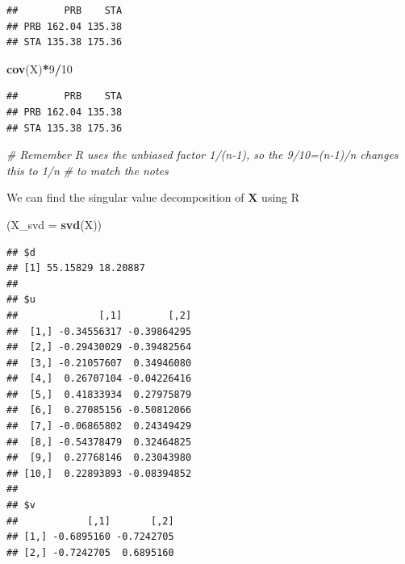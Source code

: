 \documentclass[]{book}
\newenvironment{Shaded}{\begin{snugshade}}{\end{snugshade}}
\newcommand{\CommentTok}[1]{\textcolor[rgb]{0.56,0.35,0.01}{\textit{#1}}}
\newcommand{\DataTypeTok}[1]{\textcolor[rgb]{0.13,0.29,0.53}{#1}}
\newcommand{\DecValTok}[1]{\textcolor[rgb]{0.00,0.00,0.81}{#1}}
\newcommand{\KeywordTok}[1]{\textcolor[rgb]{0.13,0.29,0.53}{\textbf{#1}}}
\newcommand{\NormalTok}[1]{#1}
\newcommand{\OperatorTok}[1]{\textcolor[rgb]{0.81,0.36,0.00}{\textbf{#1}}}
\newcommand{\StringTok}[1]{\textcolor[rgb]{0.31,0.60,0.02}{#1}}
\theoremstyle{definition}
\theoremstyle{definition}
\theoremstyle{definition}
\theoremstyle{remark}
\begin{document}
\begin{Shaded}
\end{Shaded}

\begin{verbatim}
##        PRB    STA
## PRB 162.04 135.38
## STA 135.38 175.36
\end{verbatim}

\begin{Shaded}
\begin{Highlighting}[]
\KeywordTok{cov}\NormalTok{(X)}\OperatorTok{*}\DecValTok{9}\OperatorTok{/}\DecValTok{10} 
\end{Highlighting}
\end{Shaded}

\begin{verbatim}
##        PRB    STA
## PRB 162.04 135.38
## STA 135.38 175.36
\end{verbatim}

\begin{Shaded}
\begin{Highlighting}[]
\CommentTok{# Remember R uses the unbiased factor 1/(n-1), so the 9/10=(n-1)/n changes this to 1/n }
\CommentTok{# to match the notes}
\end{Highlighting}
\end{Shaded}

We can find the singular value decomposition of \(\boldsymbol X\) using R

\begin{Shaded}
\begin{Highlighting}[]
\NormalTok{(}\DataTypeTok{X_svd =} \KeywordTok{svd}\NormalTok{(X))}
\end{Highlighting}
\end{Shaded}

\begin{verbatim}
## $d
## [1] 55.15829 18.20887
## 
## $u
##              [,1]        [,2]
##  [1,] -0.34556317 -0.39864295
##  [2,] -0.29430029 -0.39482564
##  [3,] -0.21057607  0.34946080
##  [4,]  0.26707104 -0.04226416
##  [5,]  0.41833934  0.27975879
##  [6,]  0.27085156 -0.50812066
##  [7,] -0.06865802  0.24349429
##  [8,] -0.54378479  0.32464825
##  [9,]  0.27768146  0.23043980
## [10,]  0.22893893 -0.08394852
## 
## $v
##            [,1]       [,2]
## [1,] -0.6895160 -0.7242705
## [2,] -0.7242705  0.6895160
\end{verbatim}
\end{document}
